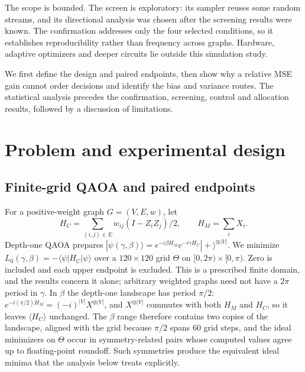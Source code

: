 The scope is bounded. The screen is exploratory: its sampler reuses some random streams, and its directional analysis was chosen after the screening results were known. The confirmation addresses only the four selected conditions, so it establishes reproducibility rather than frequency across graphs. Hardware, adaptive optimizers and deeper circuits lie outside this simulation study.

We first define the design and paired endpoints, then show why a relative MSE gain cannot order decisions and identify the bias and variance routes. The statistical analysis precedes the confirmation, screening, control and allocation results, followed by a discussion of limitations.

\section{Problem and experimental design}
\subsection{Finite-grid QAOA and paired endpoints}
For a positive-weight graph $G=(V,E,w)$, let
\begin{equation}
 H_C=\sum_{(i,j)\in E}w_{ij}(I-Z_iZ_j)/2,\qquad H_M=\sum_i X_i.
\end{equation}
Depth-one QAOA prepares $|\psi(\gamma,\beta)\rangle=e^{-i\beta H_M}e^{-i\gamma H_C}|+\rangle^{\otimes |V|}$. We minimize $L_0(\gamma,\beta)=-\langle\psi|H_C|\psi\rangle$ over a $120\times120$ grid $\Theta$ on $[0,2\pi)\times[0,\pi)$. Zero is included and each upper endpoint is excluded. This is a prescribed finite domain, and the results concern it alone; arbitrary weighted graphs need not have a $2\pi$ period in $\gamma$. In $\beta$ the depth-one landscape has period $\pi/2$: $e^{-i(\pi/2)H_M}=(-i)^{|V|}X^{\otimes|V|}$, and $X^{\otimes|V|}$ commutes with both $H_M$ and $H_C$, so it leaves $\langle H_C\rangle$ unchanged. The $\beta$ range therefore contains two copies of the landscape, aligned with the grid because $\pi/2$ spans 60 grid steps, and the ideal minimizers on $\Theta$ occur in symmetry-related pairs whose computed values agree up to floating-point roundoff. Such symmetries produce the equivalent ideal minima that the analysis below treats explicitly.

